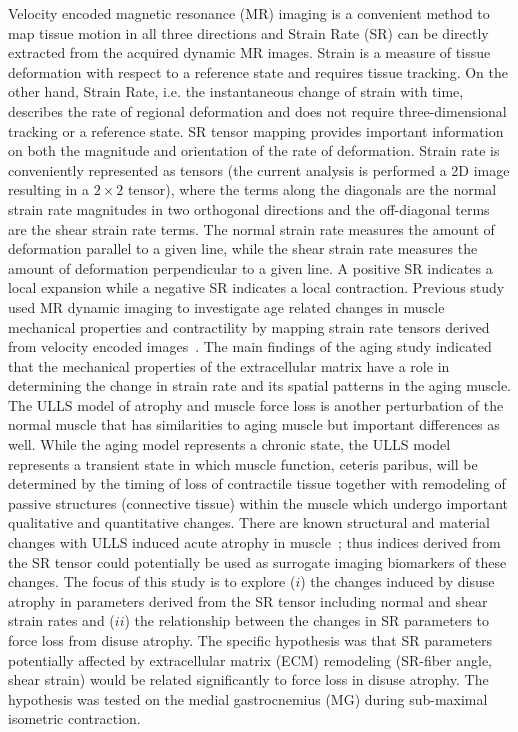 Velocity encoded magnetic resonance (MR) imaging is a convenient method to map tissue motion in all three directions and Strain Rate (SR) can be directly extracted from the acquired dynamic MR images. 
Strain is a measure of tissue deformation with respect to a reference state and requires tissue tracking. 
On the other hand, Strain Rate, i.e. the instantaneous change of strain with time, describes the rate of regional deformation and does not require three-dimensional tracking or a reference state. 
SR tensor mapping provides important information on both the magnitude and orientation of the rate of deformation. 
Strain rate is conveniently represented as tensors (the current analysis is performed a 2D image resulting in a $2 \times 2$ tensor), where the terms along the diagonals are the normal strain rate magnitudes in two orthogonal directions and the off-diagonal terms are the shear strain rate terms. 
The normal strain rate measures the amount of deformation parallel to a given line, while the shear strain rate measures the amount of deformation perpendicular to a given line. 
A positive SR indicates a local expansion while a negative SR indicates a local contraction. 
Previous study used MR dynamic imaging to investigate age related changes in muscle mechanical properties and contractility by mapping strain rate tensors derived from velocity encoded images~\cite{RNS16}. 
The main findings of the aging study indicated that the mechanical properties of the extracellular matrix have a role in determining the change in strain rate and its spatial patterns in the aging muscle.
The ULLS model of atrophy and muscle force loss is another perturbation of the normal muscle that has similarities to aging muscle but important differences as well. 
While the aging model represents a chronic state, the ULLS model represents a transient state in which muscle function, ceteris paribus, will be determined by the timing of loss of contractile tissue together with remodeling of passive structures (connective tissue) within the muscle which undergo important qualitative and quantitative changes. 
There are known structural and material changes with ULLS induced acute atrophy in muscle~\cite{RNS8, RNS17, RNS18}; thus indices derived from the SR tensor could potentially be used as surrogate imaging biomarkers of these changes.
The focus of this study is to explore ($i$) the changes induced by disuse atrophy in parameters derived from the SR tensor including normal and shear strain rates and ($ii$) the relationship between the changes in SR parameters to force loss from disuse atrophy. 
The specific hypothesis was that SR parameters potentially affected by extracellular matrix (ECM) remodeling (SR-fiber angle, shear strain) would be related significantly to force loss in disuse atrophy. 
The hypothesis was tested on the medial gastrocnemius (MG) during sub-maximal isometric contraction.

